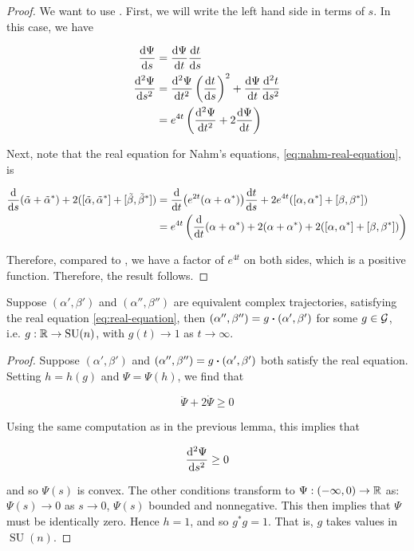 \documentclass{article}
\DeclareMathOperator{\SU}{SU}
\begin{document}
\begin{proof}
    We want to use \cite[Lemma 2.10]{donaldson_nahms_1984}. First, we will write the left hand side in terms of \(s\). In this case, we have

    \begin{align*}
        \dv{\Psi}{s} &= \dv{\Psi}{t}\dv{t}{s} \\
        \dv[2]{\Psi}{s} &= \dv[2]{\Psi}{t}\left(\dv{t}{s}\right)^2 + \dv{\Psi}{t}\dv[2]{t}{s} \\
        &= e^{4t}\left(\dv[2]{\Psi}{t} + 2\dv{\Psi}{t}\right) 
    \end{align*}

    Next, note that the real equation for Nahm's equations, \cref{eq:nahm-real-equation}, is

    \begin{align*}
        \dv{s}(\tilde\alpha + \tilde\alpha^*) + 2([\tilde\alpha, \tilde\alpha^*] + [\tilde\beta, \tilde\beta^*]) &=\dv{t}(e^{2t}(\alpha + \alpha^*))\dv{t}{s} + 2e^{4t}([\alpha, \alpha^*] + [\beta, \beta^*]) \\
        &= e^{4t}\left(\dv{t}(\alpha + \alpha^*) + 2(\alpha + \alpha^*) + 2([\alpha, \alpha^*] + [\beta, \beta^*])\right)
    \end{align*}

    Therefore, compared to \cite[Lemma 2.10]{donaldson_nahms_1984}, we have a factor of \(e^{4t}\) on both sides, which is a positive function. Therefore, the result follows.
\end{proof}

\begin{proposition}
    \label{prop:real-equation-uniqueness}
    Suppose \((\alpha', \beta')\) and \((\alpha'', \beta'')\) are equivalent complex trajectories, satisfying the real equation \cref{eq:real-equation}, then \((\alpha'', \beta'') = g\vdot(\alpha', \beta')\) for some \(g \in \mathcal{G}\), i.e. \(g : \R \to \SU(n)\), with \(g(t) \to 1\) as \(t \to \infty\).
\end{proposition}

\begin{proof}
    Suppose \((\alpha', \beta')\) and \((\alpha'', \beta'') = g\vdot(\alpha', \beta')\) both satisfy the real equation. Setting \(h = h(g)\) and \(\Psi = \Psi(h)\), we find that

    \[\ddot \Psi + 2\dot\Psi \ge 0\]

    Using the same computation as in the previous lemma, this implies that

    \[\dv[2]{\Psi}{s} \ge 0\]

    and so \(\Psi(s)\) is convex. The other conditions transform to \(\Psi : (-\infty, 0) \to \mathbb{R}\) as: \(\Psi(s) \to 0\) as \(s \to 0\), \(\Psi(s)\) bounded and nonnegative. This then implies that \(\Psi\) must be identically zero. Hence \(h = 1\), and so \(g^*g = 1\). That is, \(g\) takes values in \(\SU(n)\).
\end{proof}
\end{document}

